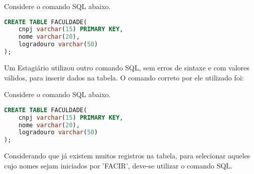 \documentclass[12pt,answers]{exam}
\begin{document}
\begin{questions}



\question Considere o comando SQL abaixo.

\begin{lstlisting}[language=sql]
CREATE TABLE FACULDADE(
    cnpj varchar(15) PRIMARY KEY,
    nome varchar(20),
    logradouro varchar(50)
);
\end{lstlisting}
\vspace{1mm}
Um Estagiário utilizou outro comando SQL, sem erros de sintaxe e com valores válidos, para inserir dados na tabela. O comando correto por ele utilizado foi: 



\question Considere o comando SQL abaixo.

\begin{lstlisting}[language=sql]
CREATE TABLE FACULDADE(
    cnpj varchar(15) PRIMARY KEY,
    nome varchar(20),
    logradouro varchar(50)
);
\end{lstlisting}
\vspace{1mm}
Considerando que já existem muitos registros na tabela, para selecionar aqueles cujo nomes sejam iniciados por 'FACIR', deve-se utilizar o comando SQL.


\end{questions}
\end{document}
